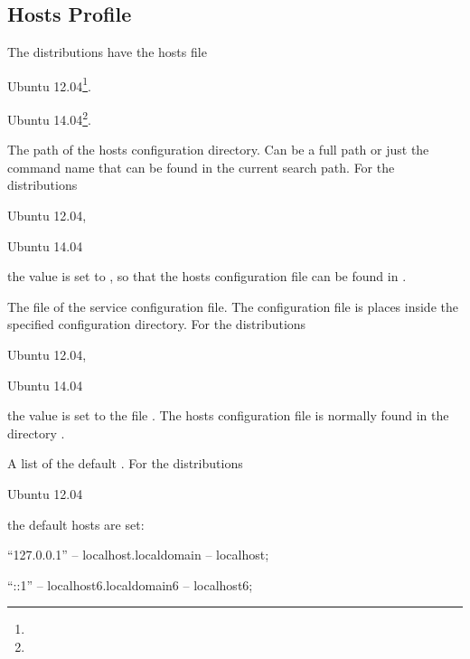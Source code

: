 \subsection{Hosts Profile}

The distributions have the hosts file
\begin{compactitem}
\item[\TheDistribution{ubuntu}] Ubuntu 12.04\footnote{\TheUbuntuPreciseLTSDate}.
\item[\TheDistribution{ubuntu}] Ubuntu 14.04\footnote{\TheUbuntuTrustyLTSDate}.
\end{compactitem}


The path of the hosts configuration directory. Can be a full path or
just the command name that can be found in the current search path.
For the distributions
\begin{inparaitem}
\item[\TheDistribution{ubuntu}] Ubuntu 12.04,
\item[\TheDistribution{ubuntu}] Ubuntu 14.04
\end{inparaitem}
the value is set to , so that the hosts configuration
file can be found in .


The file  of the service configuration file. The configuration file
is places inside the specified configuration directory.
For the distributions
\begin{inparaitem}
\item[\TheDistribution{ubuntu}] Ubuntu 12.04,
\item[\TheDistribution{ubuntu}] Ubuntu 14.04
\end{inparaitem}
the value is set to the file . The hosts configuration
file is normally found in the directory .


A list of the default .
For the distributions
\begin{inparaitem}
\item[\TheDistribution{ubuntu}] Ubuntu 12.04
\end{inparaitem}
the default hosts are set:
\begin{compactitem}
\item ``127.0.0.1'' -- localhost.localdomain -- localhost;
\item ``::1'' -- localhost6.localdomain6 -- localhost6;
\end{compactitem}

